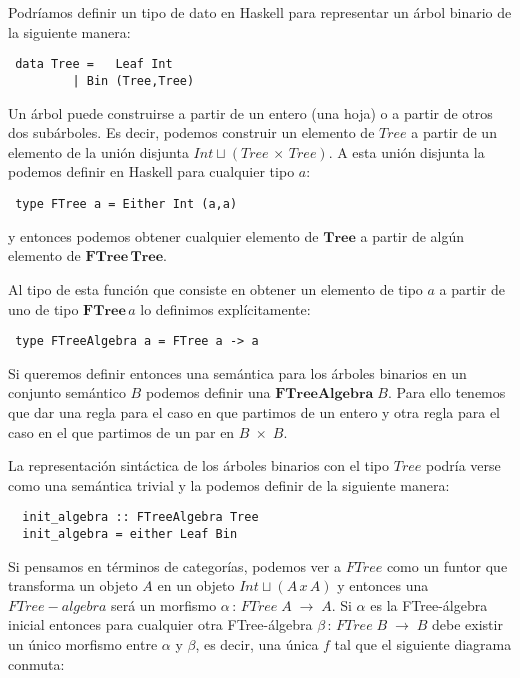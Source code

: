 \documentclass[a4paper,10pt]{article}
\begin{document}
\

\

Podríamos definir un tipo de dato en Haskell para representar un árbol binario
de la siguiente manera:

\begin{lstlisting}
 data Tree =   Leaf Int 
	     | Bin (Tree,Tree)
\end{lstlisting}

Un árbol puede construirse a partir de un entero (una hoja) o a partir de otros
dos subárboles. Es decir, podemos construir un elemento de $Tree$ a partir
de un elemento de la unión disjunta $Int \sqcup (Tree\,\times\,Tree)$.
A esta unión disjunta la podemos definir en Haskell para cualquier tipo $a$:

\begin{lstlisting}
 type FTree a = Either Int (a,a)
\end{lstlisting}

\noindent y entonces podemos obtener cualquier elemento de $\mathbf{Tree}$ a partir de algún elemento de
$\mathbf{FTree\,Tree}$.

Al tipo de esta función que consiste en obtener un elemento de tipo $a$ a partir de uno de tipo
$\mathbf{FTree}\,a$ lo definimos explícitamente:

\begin{lstlisting}
 type FTreeAlgebra a = FTree a -> a
\end{lstlisting}



Si queremos definir entonces una semántica para los árboles binarios en un conjunto
semántico $B$ podemos definir una $\mathbf{FTreeAlgebra}\;B$. Para ello tenemos que dar
una regla para el caso en que partimos de un entero y otra regla para el caso en el que 
partimos de un par en $B\;\times\;B$.

La representación sintáctica de los árboles binarios con el tipo $Tree$ podría verse como una
semántica trivial y la podemos definir de la siguiente manera:

\begin{lstlisting}
  init_algebra :: FTreeAlgebra Tree
  init_algebra = either Leaf Bin
\end{lstlisting}

Si pensamos en términos de categorías, podemos ver a $FTree$ como un funtor que transforma
un objeto $A$ en un objeto $Int \sqcup (A\,x\,A)$ y entonces una $FTree-algebra$ será un morfismo
$\alpha\,:\,FTree\;A\;\rightarrow\;A$. Si $\alpha$ es la FTree-álgebra inicial entonces para cualquier otra
FTree-álgebra $\beta\,:\,FTree\;B\;\rightarrow\;B$ debe existir un único morfismo entre $\alpha$ y $\beta$, es decir, una única $f$ tal que el siguiente diagrama conmuta:
\end{document}
